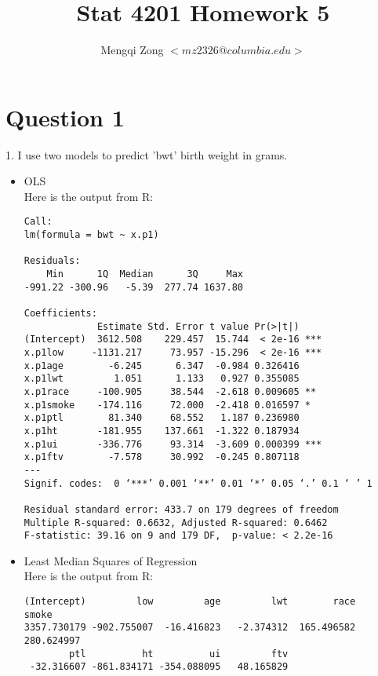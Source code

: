 \documentclass[12pt]{article}
\title{Stat 4201 Homework 5}
\author{Mengqi Zong $<mz2326@columbia.edu>$}
\begin{document}
\maketitle

\setlength{\parindent}{0in}

\section*{Question 1}

1. I use two models to predict 'bwt' birth weight in grams.

\begin{itemize}
\item OLS\\

  Here is the output from R:

\begin{verbatim}
Call:
lm(formula = bwt ~ x.p1)

Residuals:
    Min      1Q  Median      3Q     Max 
-991.22 -300.96   -5.39  277.74 1637.80 

Coefficients:
             Estimate Std. Error t value Pr(>|t|)    
(Intercept)  3612.508    229.457  15.744  < 2e-16 ***
x.p1low     -1131.217     73.957 -15.296  < 2e-16 ***
x.p1age        -6.245      6.347  -0.984 0.326416    
x.p1lwt         1.051      1.133   0.927 0.355085    
x.p1race     -100.905     38.544  -2.618 0.009605 ** 
x.p1smoke    -174.116     72.000  -2.418 0.016597 *  
x.p1ptl        81.340     68.552   1.187 0.236980    
x.p1ht       -181.955    137.661  -1.322 0.187934    
x.p1ui       -336.776     93.314  -3.609 0.000399 ***
x.p1ftv        -7.578     30.992  -0.245 0.807118    
---
Signif. codes:  0 ‘***’ 0.001 ‘**’ 0.01 ‘*’ 0.05 ‘.’ 0.1 ‘ ’ 1 

Residual standard error: 433.7 on 179 degrees of freedom
Multiple R-squared: 0.6632,	Adjusted R-squared: 0.6462 
F-statistic: 39.16 on 9 and 179 DF,  p-value: < 2.2e-16 
\end{verbatim}

\item Least Median Squares of Regression\\

  Here is the output from R:

\begin{verbatim}
(Intercept)         low         age         lwt        race       smoke 
3357.730179 -902.755007  -16.416823   -2.374312  165.496582  280.624997 
        ptl          ht          ui         ftv 
 -32.316607 -861.834171 -354.088095   48.165829 
\end{verbatim}

\end{itemize}
\end{document}
